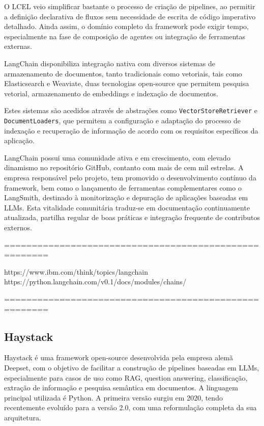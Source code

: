O LCEL veio simplificar bastante o processo de criação de pipelines, ao permitir a definição declarativa de fluxos sem necessidade de escrita de código imperativo detalhado. Ainda assim, o domínio completo da framework pode exigir tempo, especialmente na fase de composição de agentes ou integração de ferramentas externas.


LangChain disponibiliza integração nativa com diversos sistemas de armazenamento de documentos, tanto tradicionais como vetoriais, tais como Elasticsearch e Weaviate, duas tecnologias open-source que permitem pesquisa vetorial, armazenamento de embeddings e indexação de documentos.

Estes sistemas são acedidos através de abstrações como \texttt{VectorStoreRetriever} e \texttt{DocumentLoaders}, que permitem a configuração e adaptação do processo de indexação e recuperação de informação de acordo com os requisitos específicos da aplicação.


LangChain possui uma comunidade ativa e em crescimento, com elevado dinamismo no repositório GitHub, contanto com mais de cem mil estrelas. A empresa responsável pelo projeto, tem promovido o desenvolvimento contínuo da framework, bem como o lançamento de ferramentas complementares como o LangSmith, destinado à monitorização e depuração de aplicações baseadas em LLMs. Esta vitalidade comunitária traduz-se em documentação continuamente atualizada, partilha regular de boas práticas e integração frequente de contributos externos.


======================================================

https://www.ibm.com/think/topics/langchain
https://python.langchain.com/v0.1/docs/modules/chains/


======================================================



\subsection{Haystack}


Haystack é uma framework open-source desenvolvida pela empresa alemã Deepset, com o objetivo de facilitar a construção de pipelines baseadas em LLMs, especialmente para casos de uso como RAG, question answering, classificação, extração de informação e pesquisa semântica em documentos. A linguagem principal utilizada é Python. A primeira versão surgiu em 2020, tendo recentemente evoluído para a versão 2.0, com uma reformulação completa da sua arquitetura.


